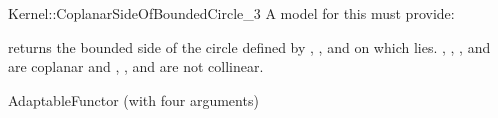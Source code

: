 \begin{ccRefFunctionObjectConcept}{Kernel::CoplanarSideOfBoundedCircle_3}
A model for this must provide:


         {returns the bounded side of the circle defined
          by , , and  on which  lies.
          \ccPrecond {}, , , and  are coplanar and
          , , and  are not collinear.}

\ccRefines
AdaptableFunctor (with four arguments)

\ccSeeAlso
{}\\

\end{ccRefFunctionObjectConcept}

